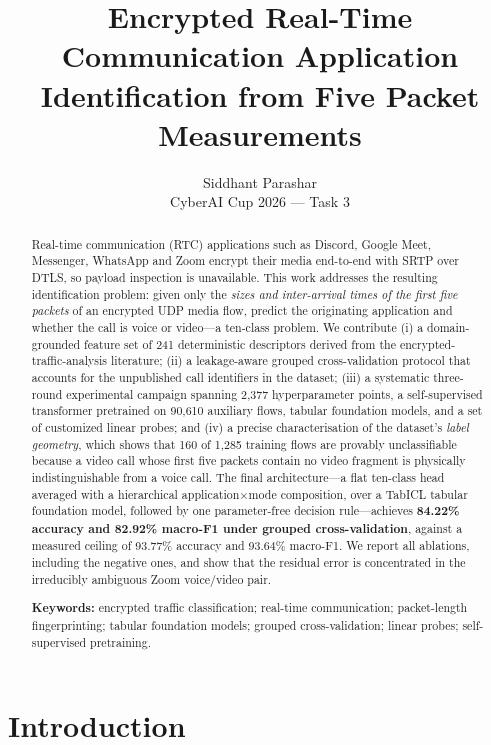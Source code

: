 \documentclass[11pt]{article}
\title{\LARGE\bfseries Encrypted Real-Time Communication Application\\[2pt] Identification from Five Packet Measurements}
\author{\large Siddhant Parashar\\[2pt] \normalsize CyberAI Cup 2026 --- Task 3}
\date{}
\newcommand{\mxF}[1]{\textbf{#1}}
\begin{document}
\maketitle

\begin{abstract}
\noindent
Real-time communication (RTC) applications such as Discord, Google Meet, Messenger, WhatsApp and Zoom
encrypt their media end-to-end with SRTP over DTLS, so payload inspection is unavailable. This work
addresses the resulting identification problem: given only the \emph{sizes and inter-arrival times of the
first five packets} of an encrypted UDP media flow, predict the originating application and whether the
call is voice or video---a ten-class problem. We contribute (i) a domain-grounded feature set of 241
deterministic descriptors derived from the encrypted-traffic-analysis literature; (ii) a leakage-aware
grouped cross-validation protocol that accounts for the unpublished call identifiers in the dataset;
(iii) a systematic three-round experimental campaign spanning 2{,}377 hyperparameter points, a
self-supervised transformer pretrained on 90{,}610 auxiliary flows, tabular foundation models, and a set
of customized linear probes; and (iv) a precise characterisation of the dataset's \emph{label geometry},
which shows that 160 of 1{,}285 training flows are provably unclassifiable because a video call whose first
five packets contain no video fragment is physically indistinguishable from a voice call. The final
architecture---a flat ten-class head averaged with a hierarchical application$\times$mode composition,
over a TabICL tabular foundation model, followed by one parameter-free decision rule---achieves
\mxF{84.22\% accuracy and 82.92\% macro-F1 under grouped cross-validation}, against a measured ceiling of
93.77\% accuracy and 93.64\% macro-F1. We report all ablations, including the negative ones, and show that
the residual error is concentrated in the irreducibly ambiguous Zoom voice/video pair.

\medskip
\noindent\textbf{Keywords:} encrypted traffic classification; real-time communication; packet-length
fingerprinting; tabular foundation models; grouped cross-validation; linear probes; self-supervised
pretraining.
\end{abstract}

\tableofcontents
\newpage

\section{Introduction}
\end{document}
